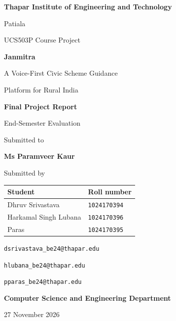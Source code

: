 \documentclass[11pt,a4paper,oneside]{report}
\newcommand{\ReportDate}{27 November 2026}
\newcommand{\Advisor}{Ms Paramveer Kaur}
\begin{document}
\hypersetup{pageanchor=false}
\begin{titlepage}
  \centering
  {\large\bfseries Thapar Institute of Engineering and Technology\par}
  \vspace{0.2cm}
  {\large Patiala\par}
  \vspace{0.9cm}
  {\large UCS503P Course Project\par}
  \vspace{1.1cm}
  {\Huge\bfseries Janmitra\par}
  \vspace{0.4cm}
  {\LARGE A Voice-First Civic Scheme Guidance\par
    Platform for Rural India\par}
  \vspace{0.8cm}
  {\Large\bfseries Final Project Report\par}
  \vspace{0.2cm}
  {\large End-Semester Evaluation\par}
  \vspace{1.2cm}
  {\large Submitted to\par}
  \vspace{0.15cm}
  {\Large\bfseries \Advisor\par}
  \vspace{1.0cm}
  {\large Submitted by\par}
  \vspace{0.3cm}
  \begin{tabular}{@{}ll@{}}
    \textbf{Student} & \textbf{Roll number} \\
    \midrule
    Dhruv Srivastava & \texttt{1024170394} \\
    Harkamal Singh Lubana & \texttt{1024170396} \\
    Paras & \texttt{1024170395}
  \end{tabular}
  \vspace{0.4cm}
  \par{\small
    \texttt{dsrivastava\_be24@thapar.edu}\par
    \texttt{hlubana\_be24@thapar.edu}\par
    \texttt{pparas\_be24@thapar.edu}\par}
  \vfill
  {\large\bfseries Computer Science and Engineering Department\par}
  \vspace{0.4cm}
  {\large \ReportDate\par}
\end{titlepage}
\end{document}
